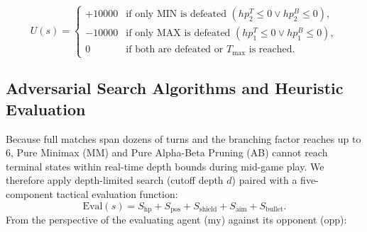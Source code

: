 \begin{itemize}
    \begin{equation}
    U(s) = \begin{cases}
    +10000 & \text{if only MIN is defeated } (hp^T_2 \le 0 \lor hp^B_2 \le 0), \\
    -10000 & \text{if only MAX is defeated } (hp^T_1 \le 0 \lor hp^B_1 \le 0), \\
    0 & \text{if both are defeated or } T_{\max} \text{ is reached.}
    \end{cases}
    \end{equation}
\end{itemize}

\subsection{Adversarial Search Algorithms and Heuristic Evaluation}
Because full matches span dozens of turns and the branching factor reaches up to $6$, Pure Minimax (MM) and Pure Alpha-Beta Pruning (AB) cannot reach terminal states within real-time depth bounds during mid-game play. We therefore apply depth-limited search (cutoff depth $d$) paired with a five-component tactical evaluation function:
\begin{equation}
\text{Eval}(s) = S_{\text{hp}} + S_{\text{pos}} + S_{\text{shield}} + S_{\text{aim}} + S_{\text{bullet}}.
\end{equation}
From the perspective of the evaluating agent ($\text{my}$) against its opponent ($\text{opp}$):
